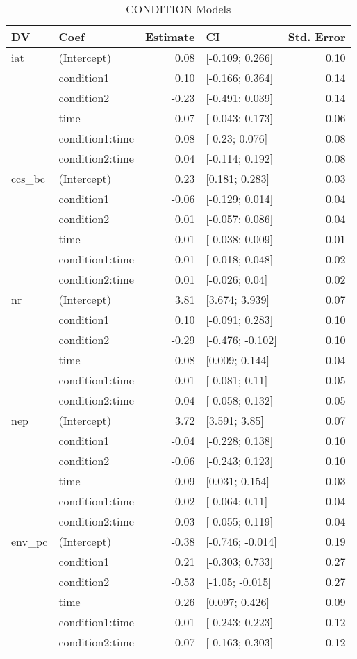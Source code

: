\begin{table}[ht]
\centering
\begin{tabular}{llrlr}
  \hline
DV & Coef & Estimate & CI & Std. Error \\ 
  \hline
iat & (Intercept) & 0.08 & [-0.109; 0.266] & 0.10 \\ 
   & condition1 & 0.10 & [-0.166; 0.364] & 0.14 \\ 
   & condition2 & -0.23 & [-0.491; 0.039] & 0.14 \\ 
   & time & 0.07 & [-0.043; 0.173] & 0.06 \\ 
   & condition1:time & -0.08 & [-0.23; 0.076] & 0.08 \\ 
   & condition2:time & 0.04 & [-0.114; 0.192] & 0.08 \\ 
   \hline
ccs\_bc & (Intercept) & 0.23 & [0.181; 0.283] & 0.03 \\ 
   & condition1 & -0.06 & [-0.129; 0.014] & 0.04 \\ 
   & condition2 & 0.01 & [-0.057; 0.086] & 0.04 \\ 
   & time & -0.01 & [-0.038; 0.009] & 0.01 \\ 
   & condition1:time & 0.01 & [-0.018; 0.048] & 0.02 \\ 
   & condition2:time & 0.01 & [-0.026; 0.04] & 0.02 \\ 
   \hline
nr & (Intercept) & 3.81 & [3.674; 3.939] & 0.07 \\ 
   & condition1 & 0.10 & [-0.091; 0.283] & 0.10 \\ 
   & condition2 & -0.29 & [-0.476; -0.102] & 0.10 \\ 
   & time & 0.08 & [0.009; 0.144] & 0.04 \\ 
   & condition1:time & 0.01 & [-0.081; 0.11] & 0.05 \\ 
   & condition2:time & 0.04 & [-0.058; 0.132] & 0.05 \\ 
   \hline
nep & (Intercept) & 3.72 & [3.591; 3.85] & 0.07 \\ 
   & condition1 & -0.04 & [-0.228; 0.138] & 0.10 \\ 
   & condition2 & -0.06 & [-0.243; 0.123] & 0.10 \\ 
   & time & 0.09 & [0.031; 0.154] & 0.03 \\ 
   & condition1:time & 0.02 & [-0.064; 0.11] & 0.04 \\ 
   & condition2:time & 0.03 & [-0.055; 0.119] & 0.04 \\ 
   \hline
env\_pc & (Intercept) & -0.38 & [-0.746; -0.014] & 0.19 \\ 
   & condition1 & 0.21 & [-0.303; 0.733] & 0.27 \\ 
   & condition2 & -0.53 & [-1.05; -0.015] & 0.27 \\ 
   & time & 0.26 & [0.097; 0.426] & 0.09 \\ 
   & condition1:time & -0.01 & [-0.243; 0.223] & 0.12 \\ 
   & condition2:time & 0.07 & [-0.163; 0.303] & 0.12 \\ 
   \hline
\end{tabular}
\caption{CONDITION Models } 
\label{tab:condition-models}
\end{table}
